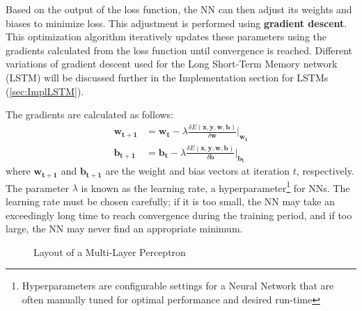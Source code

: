 \documentclass[12pt,a4paper,twoside,openright]{report}
\renewcommand{\vec}[1]{\mathbf{#1}}
\begin{document}
Based on the output of the loss function, the NN can then adjust its weights and biases to minimize
loss. This adjustment is performed using \textbf{gradient descent}. This optimization algorithm
iteratively updates these parameters using the gradients calculated from the loss function until
convergence is reached. Different variations of gradient descent used for the Long Short-Term Memory 
network (LSTM) will be discussed further in the Implementation section for LSTMs
(\cref{sec:ImplLSTM}).

The gradients are calculated as follows:
\begin{align}
\vec{w_{t+1}} &= \vec{w_t} - \lambda \frac{\delta E(\vec{x}, \vec{y}, \vec{w}, \vec{b})}{\delta \vec{w}} \Big|_\vec{w_t}\\
\vec{b_{t+1}} &= \vec{b_t} - \lambda \frac{\delta E(\vec{x}, \vec{y}, \vec{w}, \vec{b})}{\delta \vec{b}} \Big|_\vec{b_t}
\end{align}
where $\vec{w_{t+1}}$ and $\vec{b_{t+1}}$ are the weight and bias vectors at iteration $t$, respectively.
The parameter $\lambda$ is known as the learning rate, a hyperparameter\footnote{Hyperparameters are configurable
settings for a Neural Network that are often manually tuned for optimal performance and desired run-time} for NNs.
The learning rate must be chosen carefully; if it is too small, the NN may take an exceedingly long time to reach
convergence during the training period, and if too large, the NN may never find an appropriate minimum.

\begin{figure}[H]
\centering
{}
\caption[Layout of an MLP]{Layout of a Multi-Layer Perceptron\footnotemark}
\label{fig:MLP}
\end{figure}
\end{document}
